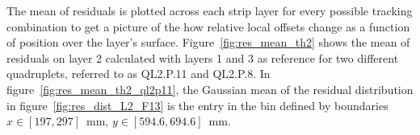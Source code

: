 The mean of residuals is plotted across each strip layer for every possible tracking combination to get a picture of the how relative local offsets change as a function of position over the layer's surface. Figure~\ref{fig:res_mean_th2} shows the mean of residuals on layer 2 calculated with layers 1 and 3 as reference for two different quadruplets, referred to as QL2.P.11 and QL2.P.8. In figure~\ref{fig:res_mean_th2_ql2p11}, the Gaussian mean of the residual distribution in figure~\ref{fig:res_dist_L2_F13} is the entry in the bin defined by boundaries $x\in\left[197, 297\right]$~mm,  $y\in\left[594.6, 694.6\right]$~mm.

